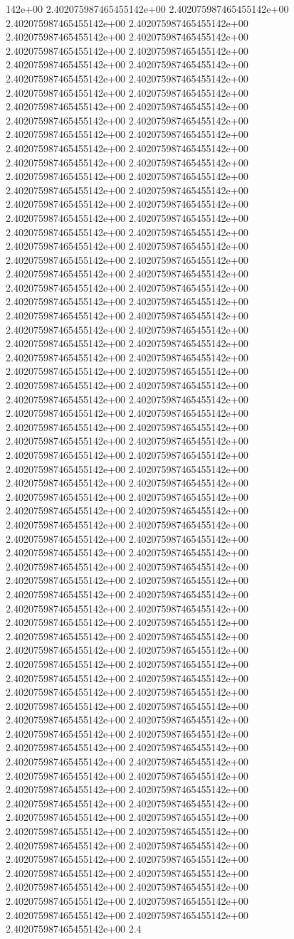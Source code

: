 142e+00	2.402075987465455142e+00	2.402075987465455142e+00	2.402075987465455142e+00	2.402075987465455142e+00	2.402075987465455142e+00	2.402075987465455142e+00	2.402075987465455142e+00	2.402075987465455142e+00	2.402075987465455142e+00	2.402075987465455142e+00	2.402075987465455142e+00	2.402075987465455142e+00	2.402075987465455142e+00	2.402075987465455142e+00	2.402075987465455142e+00	2.402075987465455142e+00	2.402075987465455142e+00	2.402075987465455142e+00	2.402075987465455142e+00	2.402075987465455142e+00	2.402075987465455142e+00	2.402075987465455142e+00	2.402075987465455142e+00	2.402075987465455142e+00	2.402075987465455142e+00	2.402075987465455142e+00	2.402075987465455142e+00	2.402075987465455142e+00	2.402075987465455142e+00	2.402075987465455142e+00	2.402075987465455142e+00	2.402075987465455142e+00	2.402075987465455142e+00	2.402075987465455142e+00	2.402075987465455142e+00	2.402075987465455142e+00	2.402075987465455142e+00	2.402075987465455142e+00	2.402075987465455142e+00	2.402075987465455142e+00	2.402075987465455142e+00	2.402075987465455142e+00	2.402075987465455142e+00	2.402075987465455142e+00	2.402075987465455142e+00	2.402075987465455142e+00	2.402075987465455142e+00	2.402075987465455142e+00	2.402075987465455142e+00	2.402075987465455142e+00	2.402075987465455142e+00	2.402075987465455142e+00	2.402075987465455142e+00	2.402075987465455142e+00	2.402075987465455142e+00	2.402075987465455142e+00	2.402075987465455142e+00	2.402075987465455142e+00	2.402075987465455142e+00	2.402075987465455142e+00	2.402075987465455142e+00	2.402075987465455142e+00	2.402075987465455142e+00	2.402075987465455142e+00	2.402075987465455142e+00	2.402075987465455142e+00	2.402075987465455142e+00	2.402075987465455142e+00	2.402075987465455142e+00	2.402075987465455142e+00	2.402075987465455142e+00	2.402075987465455142e+00	2.402075987465455142e+00	2.402075987465455142e+00	2.402075987465455142e+00	2.402075987465455142e+00	2.402075987465455142e+00	2.402075987465455142e+00	2.402075987465455142e+00	2.402075987465455142e+00	2.402075987465455142e+00	2.402075987465455142e+00	2.402075987465455142e+00	2.402075987465455142e+00	2.402075987465455142e+00	2.402075987465455142e+00	2.402075987465455142e+00	2.402075987465455142e+00	2.402075987465455142e+00	2.402075987465455142e+00	2.402075987465455142e+00	2.402075987465455142e+00	2.402075987465455142e+00	2.402075987465455142e+00	2.402075987465455142e+00	2.402075987465455142e+00	2.402075987465455142e+00	2.402075987465455142e+00	2.402075987465455142e+00	2.402075987465455142e+00	2.402075987465455142e+00	2.402075987465455142e+00	2.402075987465455142e+00	2.402075987465455142e+00	2.402075987465455142e+00	2.402075987465455142e+00	2.402075987465455142e+00	2.402075987465455142e+00	2.402075987465455142e+00	2.402075987465455142e+00	2.402075987465455142e+00	2.402075987465455142e+00	2.402075987465455142e+00	2.402075987465455142e+00	2.402075987465455142e+00	2.402075987465455142e+00	2.402075987465455142e+00	2.402075987465455142e+00	2.402075987465455142e+00	2.402075987465455142e+00	2.402075987465455142e+00	2.402075987465455142e+00	2.402075987465455142e+00	2.402075987465455142e+00	2.402075987465455142e+00	2.402075987465455142e+00	2.402075987465455142e+00	2.402075987465455142e+00	2.402075987465455142e+00	2.402075987465455142e+00	2.402075987465455142e+00	2.402075987465455142e+00	2.402075987465455142e+00	2.4